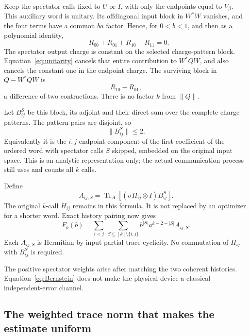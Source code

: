 \documentclass[11pt]{article}
\newcommand{\Tr}{\operatorname{Tr}}
\newcommand{\norm}[1]{\lVert #1\rVert}
\begin{document}
Keep the spectator calls fixed to \(U\) or \(I\), with only the endpoints
equal to \(V_\beta\). This auxiliary word is unitary. Its offdiagonal
input block in \(W^*W\) vanishes, and the four terms have a common \(ba\)
factor. Hence, for \(0<b<1\), and then as a polynomial identity,
\begin{equation}\label{eq:unitarity}
 -R_{00}+R_{01}+R_{10}-R_{11}=0.
\end{equation}
The spectator output charge is constant on the selected charge-pattern
block. Equation~\eqref{eq:unitarity} cancels that entire contribution to
\(W^*QW\), and also cancels the constant one in the endpoint charge.
The surviving block in \(Q-W^*QW\) is
\[
 R_{10}-R_{01},
\]
a difference of two contractions. There is no factor \(k\) from
\(\norm Q\).

Let \(B_{ij}^S\) be this block, its adjoint and their direct sum over
the complete charge patterns. The pattern pairs are disjoint, so
\begin{equation}\label{eq:Bnorm}
 \norm{B_{ij}^S}\le2.
\end{equation}
Equivalently it is the \(i,j\) endpoint component of the first coefficient
of the ordered word with spectator calls \(S\) skipped, embedded on the
original input space. This is an analytic representation only; the actual
communication process still uses and counts all \(k\) calls.

Define
\begin{equation}\label{eq:A}
 A_{ij,S}=\Tr_A[(\sigma H_{ij}\otimes I)B_{ij}^S].
\end{equation}
The original \(k\)-call \(H_{ij}\) remains in this formula. It is not replaced
by an optimizer for a shorter word. Exact history pairing now gives
\begin{equation}\label{eq:Bernstein}
 F_k(b)=\sum_{i<j}\ \sum_{S\subseteq[k]\setminus\{i,j\}}
          b^{|S|}a^{k-2-|S|}A_{ij,S}.
\end{equation}
Each \(A_{ij,S}\) is Hermitian by input partial-trace cyclicity. No
commutation of \(H_{ij}\) with \(B_{ij}^S\) is required.

The positive spectator weights arise after matching the two coherent
histories. Equation~\eqref{eq:Bernstein} does not make the physical
device a classical independent-error channel.

\subsection{The weighted trace norm that makes the estimate uniform}
\end{document}
